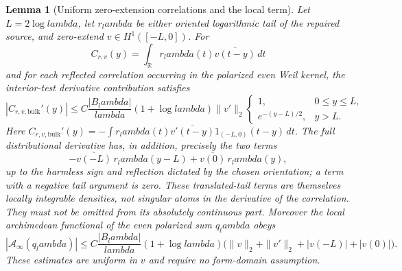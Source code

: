 \documentclass[11pt]{article}
\def\lambda{lambda}%
\newtheorem{lemma}[theorem]{Lemma}
\theoremstyle{remark}
\begin{document}
\begin{lemma}[Uniform zero-extension correlations and the local term]
\label{lem:v13-correlations}
Let $L=2\log\lambda$, let $r_\lambda$ be either oriented logarithmic tail
of the repaired source, and zero-extend $v\in H^1([-L,0])$. For
\[
 C_{r,v}(y)=\int_{\mathbb R}r_\lambda(t)
                  \overline{v(t-y)}\,dt
\]
and for each reflected correlation occurring in the polarized even Weil
kernel, the interior-test derivative contribution satisfies
\begin{equation}\label{eq:pswf-cross-tail}
 \boxed{
 |C_{r,v,\mathrm{bulk}}'(y)|
 \le C\frac{|B_\lambda|}{\lambda}(1+\log\lambda)
       \|v'\|_2
 \begin{cases}
  1,&0\le y\le L,\\[2mm]
  e^{-(y-L)/2},&y>L.
 \end{cases}}
\end{equation}
Here $C_{r,v,\mathrm{bulk}}'(y)=-\int r_\lambda(t)
\overline{v'(t-y)}1_{(-L,0)}(t-y)\,dt$.
The full distributional derivative has, in addition, precisely the two terms
\begin{equation}\label{eq:v13-correlation-jumps}
 -\overline{v(-L)}\,r_\lambda(y-L)
 +\overline{v(0)}\,r_\lambda(y),
\end{equation}
up to the harmless sign and reflection dictated by the chosen orientation;
a term with a negative tail argument is zero. These translated-tail terms
are themselves locally integrable densities, not singular atoms in the
derivative of the correlation. They must not be omitted from its
absolutely continuous part. Moreover the local
archimedean functional of the even polarized sum $q_\lambda$ obeys
\begin{equation}\label{eq:v13-archimedean}
 |\mathcal A_\infty(q_\lambda)|
 \le C\frac{|B_\lambda|}{\lambda}(1+\log\lambda)
 \bigl(\|v\|_2+\|v'\|_2+|v(-L)|+|v(0)|\bigr).
\end{equation}
These estimates are uniform in $v$ and require no form-domain assumption.
\end{lemma}
\end{document}
